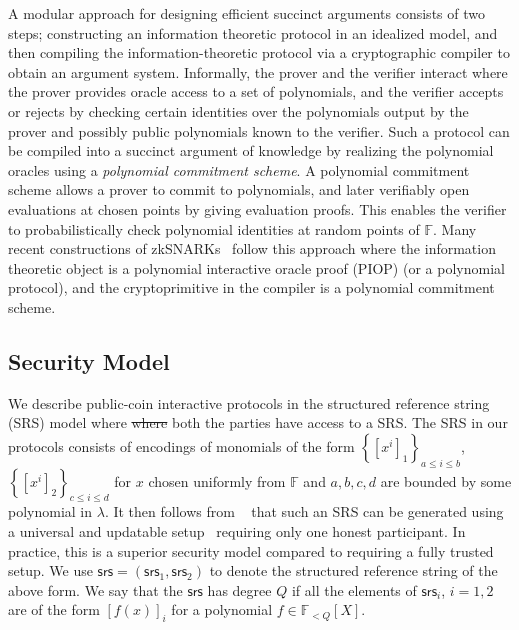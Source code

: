 \documentclass[sigconf]{acmart}
\newcommand{\F}{\mathbb{F}}
\newcommand{\srs}{\mathsf{srs}}
\newcommand{\gone}[1]{\ensuremath{\left[{#1}\right]_1}}
\newcommand{\gtwo}[1]{\ensuremath{\left[{#1}\right]_2}}
\providecommand{\DIFdeltex}[1]{{\protect\color{red}\sout{#1}}}                      %
\providecommand{\DIFdelbegin}{} %
\providecommand{\DIFdelend}{} %
\providecommand{\DIFdel}[1]{\texorpdfstring{\DIFdeltex{#1}}{}} %
\newcommand{\DIFscaledelfig}{0.5}
\newlength{\DIFdelgraphicswidth} %
\newlength{\DIFdelgraphicsheight} %
\newcommand{\DIFdelincludegraphics}[2][]{%
	\sbox{\DIFdelgraphicsbox}{\DIFOincludegraphics[#1]{#2}}%
	\settoboxwidth{\DIFdelgraphicswidth}{\DIFdelgraphicsbox} %
	\settoboxtotalheight{\DIFdelgraphicsheight}{\DIFdelgraphicsbox} %
	\scalebox{\DIFscaledelfig}{%
		\parbox[b]{\DIFdelgraphicswidth}{\usebox{\DIFdelgraphicsbox}\\[-\baselineskip] \rule{\DIFdelgraphicswidth}{0em}}\llap{\resizebox{\DIFdelgraphicswidth}{\DIFdelgraphicsheight}{%
				\setlength{\unitlength}{\DIFdelgraphicswidth}%
				\begin{picture}(1,1)%
					\thicklines\linethickness{2pt} %
					{\color[rgb]{1,0,0}\put(0,0){\framebox(1,1){}}}%
					{\color[rgb]{1,0,0}\put(0,0){\line( 1,1){1}}}%
					{\color[rgb]{1,0,0}\put(0,1){\line(1,-1){1}}}%
				\end{picture}%
			}\hspace*{3pt}}} %
} %
\DeclareRobustCommand{\DIFdelbegin}{\DIFOdelbegin \let\includegraphics\DIFdelincludegraphics} %
\DeclareRobustCommand{\DIFdelend}{\DIFOaddend \let\includegraphics\DIFOincludegraphics} %
\begin{document}
	A modular approach for designing efficient succinct arguments consists of two steps; constructing an information theoretic protocol in an idealized model, and then compiling the information-theoretic protocol via a cryptographic compiler to obtain an argument system. 
	Informally, the prover and the verifier interact where the prover provides oracle access to a set of polynomials, and the verifier accepts or rejects by checking certain identities over the polynomials output by the prover and possibly public polynomials known to the verifier. Such a protocol can be compiled into a succinct argument of knowledge by realizing the polynomial oracles using a \emph{polynomial commitment scheme}. A polynomial commitment scheme allows a prover to commit to polynomials, and later verifiably open evaluations at chosen points by giving evaluation proofs. This enables the verifier to probabilistically
	check polynomial identities at random points of $\F$. %
	Many recent constructions of zkSNARKs~\cite{EC:BunFisSze20,EC:CHMMVW20,Gabizon2019PLONKPO} follow this approach where the information theoretic object is a polynomial interactive oracle proof (PIOP) (or a polynomial protocol), and the cryptoprimitive in the compiler is a polynomial commitment scheme.
	
	\subsection{Security Model} We describe public-coin interactive protocols in the structured reference string (SRS) model where \DIFdelbegin \DIFdel{where }\DIFdelend both the parties have access to a SRS. The SRS in our protocols consists of
	encodings of monomials of the form $\left\{\gone{x^i}\right\}_{a\leq i\leq b}$, $\left\{\gtwo{x^i}\right\}_{c\leq i\leq d}$
	for $x$ chosen uniformly from $\F$ and $a,b,c,d$ are bounded by some polynomial in $\lambda$. It then follows
	from ~\cite{EPRINT:BowGabMie17} that such an SRS can be generated using a universal and updatable setup~\cite{C:GKMMM18} requiring
	only one honest participant. In practice, this is a superior security model compared to requiring a fully
	trusted setup. We use $\srs = (\srs_1,\srs_2)$ to denote the structured reference string of the above form. We say
	that the $\srs$ has degree $Q$ if all the elements of $\srs_i$, $i=1,2$ are of the form $[f(x)]_i$ for a
	polynomial $f\in \F_{<Q}[X]$.
	
\end{document}
